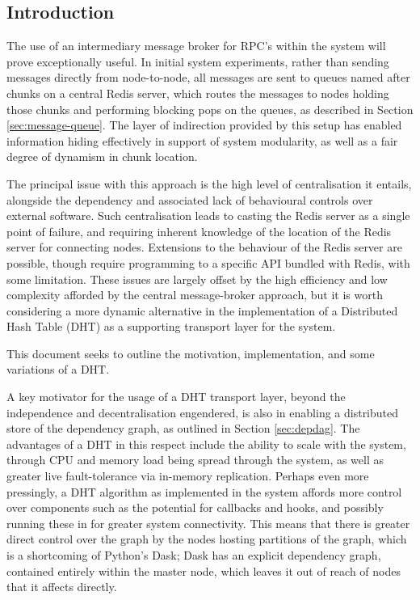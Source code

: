 \subsection{Introduction}

The use of an intermediary message broker for RPC's within the \lsr system will prove exceptionally useful.
In initial system experiments, rather than sending messages directly from node-to-node, all messages are sent to queues named after chunks on a central Redis server, which routes the messages to nodes holding those chunks and performing blocking pops on the queues\cite{sanfilippo2009redis}, as described in Section \cref{sec:message-queue}.
The layer of indirection provided by this setup has enabled information hiding effectively in support of system modularity, as well as a fair degree of dynamism in chunk location.

The principal issue with this approach is the high level of centralisation it entails, alongside the dependency and associated lack of behavioural controls over external software\cite{john2017survey}.
Such centralisation leads to casting the Redis server as a single point of failure, and requiring inherent knowledge of the location of the Redis server for connecting nodes.
Extensions to the behaviour of the Redis server are possible, though require programming to a specific API bundled with Redis, with some limitation.
These issues are largely offset by the high efficiency and low complexity afforded by the central message-broker approach, but it is worth considering a more dynamic alternative in the implementation of a Distributed Hash Table (DHT) as a supporting transport layer for the system.

This document seeks to outline the motivation, implementation, and some variations of a DHT.

A key motivator for the usage of a DHT transport layer, beyond the independence and decentralisation engendered, is also in enabling a distributed store of the dependency graph, as outlined in Section \cref{sec:depdag}.
The advantages of a DHT in this respect include the ability to scale with the system, through CPU and memory load being spread through the system, as well as greater live fault-tolerance via in-memory replication\cite{lua2005p2p}.
Perhaps even more pressingly, a DHT algorithm as implemented in the system affords more control over components such as the potential for callbacks and hooks, and possibly running these in \R{} for greater system connectivity.
This means that there is greater direct control over the graph by the nodes hosting partitions of the graph, which is a shortcoming of Python's Dask; Dask has an explicit dependency graph, contained entirely within the master node, which leaves it out of reach of nodes that it affects directly\cite{rocklin2015dask}.

